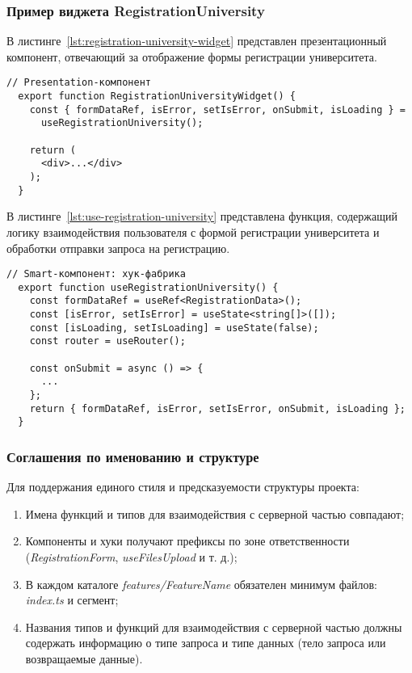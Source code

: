 \subsubsection{Пример виджета RegistrationUniversity}

В листинге~\ref{lst:registration-university-widget} представлен презентационный компонент, отвечающий за отображение формы регистрации университета.

\begin{lstlisting}[caption=Функция RegistrationUniversityWidget,label=lst:registration-university-widget]
  // Presentation-компонент
  export function RegistrationUniversityWidget() {
    const { formDataRef, isError, setIsError, onSubmit, isLoading } =
      useRegistrationUniversity();

    return (
      <div>...</div>
    );
  }
\end{lstlisting}

В листинге~\ref{lst:use-registration-university} представлена функция, содержащий логику взаимодействия пользователя с формой регистрации университета и обработки отправки запроса на регистрацию.

\begin{lstlisting}[caption=Функция useRegistrationUniversity,label=lst:use-registration-university]
  // Smart-компонент: хук-фабрика
  export function useRegistrationUniversity() {
    const formDataRef = useRef<RegistrationData>();
    const [isError, setIsError] = useState<string[]>([]);
    const [isLoading, setIsLoading] = useState(false);
    const router = useRouter();

    const onSubmit = async () => {
      ...
    };
    return { formDataRef, isError, setIsError, onSubmit, isLoading };
  }
\end{lstlisting}

\subsubsection{Соглашения по именованию и структуре}

Для поддержания единого стиля и предсказуемости структуры проекта:
\begin{enumerate}
  \item Имена функций и типов для взаимодействия с серверной частью совпадают;
  \item Компоненты и хуки получают префиксы по зоне ответственности (\textit{RegistrationForm}, \textit{useFilesUpload} и т. д.);
  \item В каждом каталоге \textit{features/FeatureName} обязателен минимум файлов: \textit{index.ts} и сегмент;
  \item Названия типов и функций для взаимодействия с серверной частью должны содержать информацию о типе запроса и типе данных (тело запроса или возвращаемые данные).
\end{enumerate}
